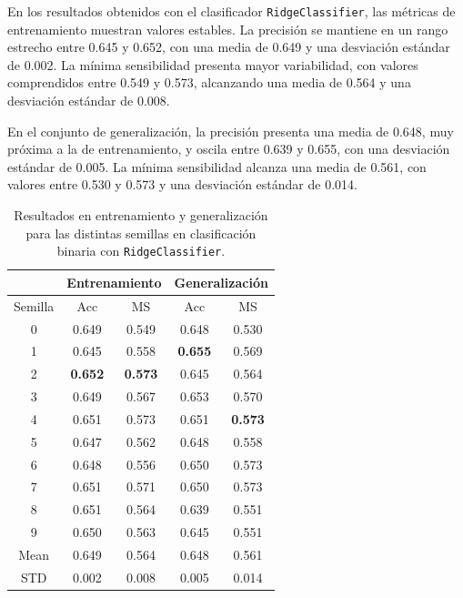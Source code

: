 En los resultados obtenidos con el clasificador \texttt{RidgeClassifier}, las métricas de entrenamiento muestran valores estables. La precisión se mantiene en un rango estrecho entre 0.645 y 0.652, con una media de 0.649 y una desviación estándar de 0.002. La mínima sensibilidad presenta mayor variabilidad, con valores comprendidos entre 0.549 y 0.573, alcanzando una media de 0.564 y una desviación estándar de 0.008.

\vspace{1em}

En el conjunto de generalización, la precisión presenta una media de 0.648, muy próxima a la de entrenamiento, y oscila entre 0.639 y 0.655, con una desviación estándar de 0.005. La mínima sensibilidad alcanza una media de 0.561, con valores entre 0.530 y 0.573 y una desviación estándar de 0.014.

\begin{table}[H]
	\centering
	\begin{tabular}{ |c|c|c|c|c| }
		\hline
		\rowcolor{LightCyan}
		 & \multicolumn{2}{c|}{Entrenamiento} & \multicolumn{2}{c|}{Generalización} \\
		\hline
		\rowcolor{LightCyan}
		 Semilla & Acc & MS & Acc & MS \\
		\hline
		0    & 0.649          & 0.549          & 0.648          & 0.530          \\
		1    & 0.645          & 0.558          & \textbf{0.655} & 0.569          \\
		2    & \textbf{0.652} & \textbf{0.573} & 0.645          & 0.564          \\
		3    & 0.649          & 0.567          & 0.653          & 0.570          \\
		4    & 0.651          & 0.573          & 0.651          & \textbf{0.573} \\
		5    & 0.647          & 0.562          & 0.648          & 0.558          \\
		6    & 0.648          & 0.556          & 0.650          & 0.573          \\
		7    & 0.651          & 0.571          & 0.650          & 0.573          \\
		8    & 0.651          & 0.564          & 0.639          & 0.551          \\
		9    & 0.650          & 0.563          & 0.645          & 0.551          \\
		Mean & 0.649          & 0.564          & 0.648          & 0.561          \\
		STD  & 0.002          & 0.008          & 0.005          & 0.014          \\
		\hline
	\end{tabular}
	\caption{Resultados en entrenamiento y generalización para las distintas semillas en clasificación binaria con \texttt{RidgeClassifier}.}
	\label{tabla:ridge_bin}
\end{table}

